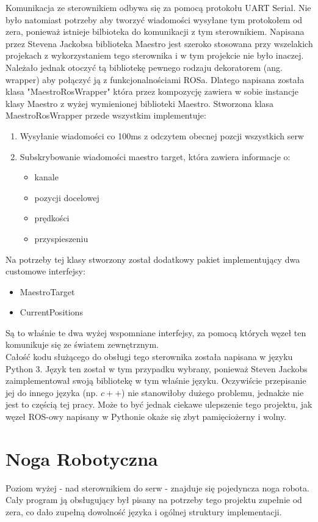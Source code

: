 Komunikacja ze sterownikiem odbywa się za pomocą protokołu UART Serial. Nie było natomiast potrzeby aby tworzyć wiadomości wysyłane tym protokołem od zera, ponieważ istnieje bilbioteka do komunikacji z tym sterownikiem. Napisana przez Stevena Jackobsa biblioteka Maestro \cite{maestro_pylib} jest szeroko stosowana przy wszelakich projekach z wykorzystaniem tego sterownika i w tym projekcie nie było inaczej. Należało jednak otoczyć tą bibliotekę pewnego rodzaju dekoratorem (ang. wrapper) aby połączyć ją z funkcjonalnościami ROSa. Dlatego napisana została klasa "MaestroRosWrapper" która przez kompozycję zawiera w sobie instancje klasy Maestro z wyżej wymienionej biblioteki Maestro. Stworzona klasa MaestroRosWrapper przede wszystkim implementuje:
\begin{enumerate}
\item Wysyłanie wiadomości co 100ms z odczytem obecnej pozcji wszystkich serw
\item Subskrybowanie wiadomości maestro target, która zawiera informacje o:
\begin{itemize}
\item kanale 
\item pozycji docelowej
\item prędkości
\item przyspieszeniu
\end{itemize}
\end{enumerate}

Na potrzeby tej klasy stworzony został dodatkowy pakiet implementujący dwa customowe interfejsy:
\begin{itemize}
\item MaestroTarget
\item CurrentPositions
\end{itemize}

Są to właśnie te dwa wyżej wspomniane interfejsy, za pomocą których węzeł ten komunikuje się ze światem zewnętrznym.\\

Całość kodu służącego do obsługi tego sterownika została napisana w języku Python 3. Język ten został w tym przypadku wybrany, ponieważ Steven Jackobs zaimplementował swoją bibliotekę w tym właśnie języku. Oczywiście przepisanie jej do innego języka (np. $c++$) nie stanowiłoby dużego problemu, jednakże nie jest to częścią tej pracy. Może to być jednak ciekawe ulepszenie tego projektu, jak węzeł ROS-owy napisany w Pythonie okaże się zbyt pamięciożerny i wolny.
\section{Noga Robotyczna}
Poziom wyżej - nad sterownikiem do serw - znajduje się pojedyncza noga robota. Cały program ją obsługujący był pisany na potrzeby tego projektu zupełnie od zera, co dało zupełną dowolność języka i ogólnej struktury implementacji. \\

